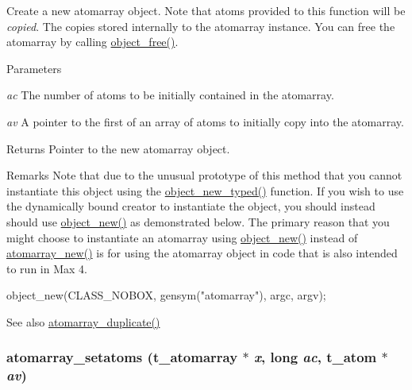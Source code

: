 Create a new atomarray object. Note that atoms provided to this function will be {\itshape copied\/}. The copies stored internally to the atomarray instance. You can free the atomarray by calling \hyperlink{group__obj_ga3759846cb356195532c41e35b87522ee}{object\_\-free()}.


\begin{DoxyParams}{Parameters}
\item[{\em ac}]The number of atoms to be initially contained in the atomarray. \item[{\em av}]A pointer to the first of an array of atoms to initially copy into the atomarray. \end{DoxyParams}
\begin{DoxyReturn}{Returns}
Pointer to the new atomarray object.
\end{DoxyReturn}
\begin{DoxyRemark}{Remarks}
Note that due to the unusual prototype of this method that you cannot instantiate this object using the \hyperlink{group__obj_ga459c71aca6316e345379eeb424ad56ff}{object\_\-new\_\-typed()} function. If you wish to use the dynamically bound creator to instantiate the object, you should instead should use \hyperlink{group__obj_gac4b370265c776db4f545d257089af1cf}{object\_\-new()} as demonstrated below. The primary reason that you might choose to instantiate an atomarray using \hyperlink{group__obj_gac4b370265c776db4f545d257089af1cf}{object\_\-new()} instead of \hyperlink{group__atomarray_ga2896b4949e03841f4c5a71ad7f7fadf7}{atomarray\_\-new()} is for using the atomarray object in code that is also intended to run in Max 4. 
\begin{DoxyCode}
    object_new(CLASS_NOBOX, gensym("atomarray"), argc, argv);
\end{DoxyCode}

\end{DoxyRemark}
\begin{DoxySeeAlso}{See also}
\hyperlink{group__atomarray_ga96ea96717c2ed692197361b1d02bab47}{atomarray\_\-duplicate()} 
\end{DoxySeeAlso}
\hypertarget{group__atomarray_ga52b68a97eb1bb7f97411715401d9d2ad}{
\subsubsection[{atomarray\_\-setatoms}]{ atomarray\_\-setatoms ({\bf t\_\-atomarray} $\ast$ {\em x}, \/  long {\em ac}, \/  {\bf t\_\-atom} $\ast$ {\em av})}}
\label{group__atomarray_ga52b68a97eb1bb7f97411715401d9d2ad}


